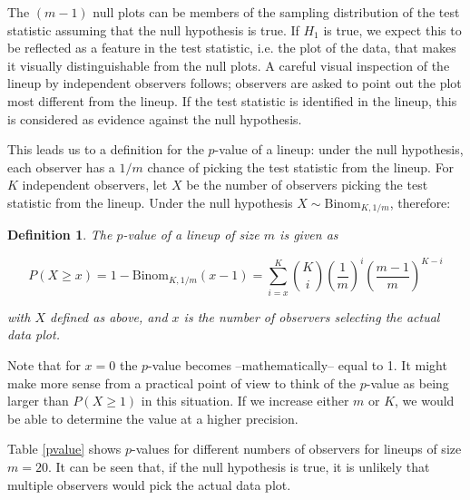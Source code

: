 \documentclass{article}
\newtheorem{dfn}{Definition}[section]
\begin{document}
\noindent The $(m-1)$ null plots can be members of the sampling distribution of the test statistic assuming that the null hypothesis is true. If $H_1$ is true, we expect this to be reflected as a feature in the test statistic, i.e. the plot of the data, that makes it visually distinguishable from the null plots. A careful visual inspection of the lineup by %
independent observers follows;  observers are asked to point out the plot most different from the lineup. If the test statistic is identified in the lineup, this is considered as evidence against the null hypothesis. 

This leads us to a definition for the $p$-value of a lineup: under the null hypothesis, each observer has a $1/m$ chance of picking the test statistic from the lineup.  For $K$ independent observers, let $X$ be  the number of observers picking the test statistic from the lineup. Under the null hypothesis $X \sim \text{Binom}_{K, 1/m}$,  therefore: 

\begin{dfn}\label{dfn:pvalue}
The $p$-value of a lineup of size $m$ is given as 

\begin{equation}\label{binom}
P(X \ge x) = 1 - \text{Binom}_{{K, 1/m}} (x-1) = \sum_{i=x}^{K} {K \choose i} \left(\frac{1}{m}\right)^{i} \left(\frac{m-1}{m}\right)^{K-i}
\end{equation}

\noindent with $X$ defined as above, and $x$ is the number of observers selecting the actual data plot. 
\end{dfn}
Note that for $x=0$ the $p$-value becomes --mathematically-- equal to 1. It might make more sense from a practical point of view to think of the $p$-value as
being larger than $P(X \ge 1)$ in this situation. If we increase either $m$ or $K$, we would be able to determine the value at a higher precision.

\noindent Table \ref{pvalue} shows $p$-values for different numbers of observers for lineups of size $m = 20$. It can be seen that, if the null hypothesis is true, it is unlikely that multiple observers would pick the actual data plot.
\end{document}
